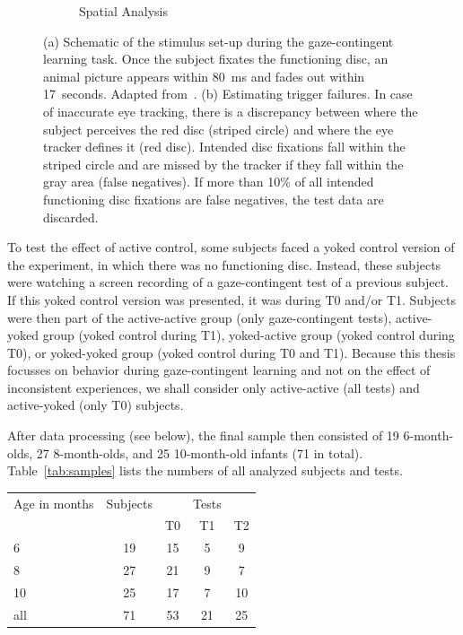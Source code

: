 \documentclass[a4paper]{scrreprt}
\begin{document}
\begin{figure}
\begin{subfigure}[b]{0.3\textwidth}
        \caption{Spatial Analysis}
    \end{subfigure}
\caption{(a) Schematic of the stimulus set-up during the gaze-contingent learning task. Once the subject fixates the functioning disc, an animal picture appears within 80~ms and fades out within 17~seconds. Adapted from~\cite{wang12}. (b) Estimating trigger failures. In case of inaccurate eye tracking, there is a discrepancy between where the subject perceives the red disc (striped circle) and where the eye tracker defines it (red disc). Intended disc fixations fall within the striped circle and are missed by the tracker if they fall within the gray area (false negatives). If more than 10\% of all intended functioning disc fixations are false negatives, the test data are discarded.}
\label{fig:exp}
\end{figure}

To test the effect of active control, some subjects faced a yoked control version of the experiment, in which there was no functioning disc. Instead, these subjects were watching a screen recording of a gaze-contingent test of a previous subject. If this yoked control version was presented, it was during T0 and/or T1. Subjects were then part of the active-active group (only gaze-contingent tests), active-yoked group (yoked control during T1), yoked-active group (yoked control during T0), or yoked-yoked group (yoked control during T0 and T1). Because this thesis focusses on behavior during gaze-contingent learning and not on the effect of inconsistent experiences, we shall consider only active-active (all tests) and active-yoked (only T0) subjects.

After data processing (see below), the final sample then consisted of 19 6-month-olds, 27 8-month-olds, and 25 10-month-old infants (71 in total). Table~\ref{tab:samples} lists the numbers of all analyzed subjects and tests. 


\begin{center}
\begin{tabular}{ l  c  c  c  c }
\hline
Age in months & Subjects & & Tests & \\
&&T0 & T1 & T2\\
\hline
6 & 19 & 15 & 5 & 9\\
8 & 27 & 21 & 9 & 7\\
10 & 25 & 17 & 7 & 10\\
\hline
all & 71 & 53 & 21 & 25\\
\hline
\end{tabular}
\label{tab:samples}
\end{center}
\end{document}
